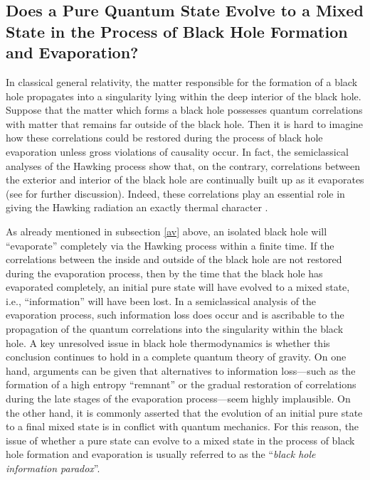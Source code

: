 \documentclass[12pt]{article}
\begin{document}
\subsection{Does a Pure Quantum State Evolve to a Mixed State in the 
Process of Black Hole Formation and Evaporation?}
\label{pm}

In classical general relativity, the matter responsible for the
formation of a black hole propagates into a singularity lying within
the deep interior of the black hole. Suppose that the matter which
forms a black hole possesses quantum correlations with matter that
remains far outside of the black hole. Then it is hard to imagine how
these correlations could be restored during the process of black hole
evaporation unless gross violations of causality occur. In fact, the
semiclassical analyses of the Hawking process show that, on the
contrary, correlations between the exterior and interior of the black
hole are continually built up as it evaporates (see \cite{w4} for
further discussion). Indeed, these correlations play an essential role
in giving the Hawking radiation an exactly thermal character
\cite{w7}.

As already mentioned in subsection \ref{av} above, an isolated black
hole will ``evaporate'' completely via the Hawking process within a
finite time. If the correlations between the inside and outside of the
black hole are not restored during the evaporation process, then by
the time that the black hole has evaporated completely, an initial
pure state will have evolved to a mixed state, i.e., ``information''
will have been lost. In a semiclassical analysis of the evaporation
process, such information loss does occur and is ascribable to the
propagation of the quantum correlations into the singularity within
the black hole. A key unresolved issue in black hole thermodynamics is
whether this conclusion continues to hold in a complete quantum theory
of gravity. On one hand, arguments can be given \cite{w4} that
alternatives to information loss---such as the formation of a high
entropy ``remnant'' or the gradual restoration of correlations during
the late stages of the evaporation process---seem highly
implausible. On the other hand, it is commonly asserted that the
evolution of an initial pure state to a final mixed state is
in conflict with quantum mechanics. For this reason, the issue of
whether a pure state can evolve to a mixed state in the process of
black hole formation and evaporation is usually referred to as the
``{\it black hole information paradox}''.
\end{document}
